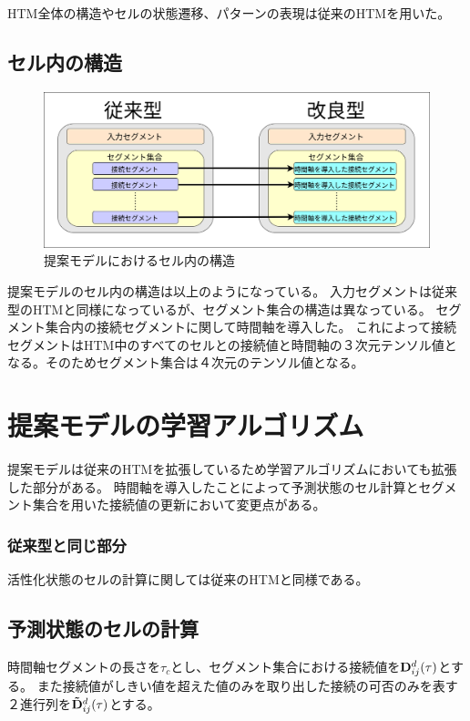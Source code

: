 HTM全体の構造やセルの状態遷移、パターンの表現は従来のHTMを用いた。

\subsection{セル内の構造}

\begin{figure}[ht]
  \begin{center}
    \includegraphics[width=14cm]{./fig/drawing_9}
    \caption{提案モデルにおけるセル内の構造}
    \label{fig:HTM_improved}
  \end{center}
\end{figure}

提案モデルのセル内の構造は以上のようになっている。
入力セグメントは従来型のHTMと同様になっているが、セグメント集合の構造は異なっている。
セグメント集合内の接続セグメントに関して時間軸を導入した。
これによって接続セグメントはHTM中のすべてのセルとの接続値と時間軸の３次元テンソル値となる。そのためセグメント集合は４次元のテンソル値となる。

\section{提案モデルの学習アルゴリズム}
提案モデルは従来のHTMを拡張しているため学習アルゴリズムにおいても拡張した部分がある。
時間軸を導入したことによって予測状態のセル計算とセグメント集合を用いた接続値の更新において変更点がある。

\subsubsection{従来型と同じ部分}

活性化状態のセルの計算に関しては従来のHTMと同様である。

\subsection{予測状態のセルの計算}
時間軸セグメントの長さを$\tau_c$とし、セグメント集合における接続値を${\bf D}^d_{ij}(\tau)$とする。
また接続値がしきい値を超えた値のみを取り出した接続の可否のみを表す２進行列を${\bf \tilde{D}}^d_{ij}(\tau)$とする。

